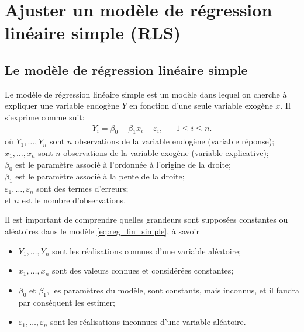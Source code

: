 \chapter{Ajuster un modèle de régression linéaire simple (RLS)}
\label{sec:AjusterRLS}

\section{Le modèle de régression linéaire simple}
\label{sec:ModèleRLS}

Le modèle de régression linéaire simple est un modèle dans lequel on cherche à expliquer une variable endogène $Y$ en fonction d'une seule variable exogène $x$. Il s'exprime comme suit:
\begin{eqnarray}
 Y_i = \beta_0 + \beta_1 x_i + \varepsilon_i, \ \ \ \ \ \ \ 1\leq i \leq n.
 \label{eq:reg_lin_simple}
\end{eqnarray}
où $Y_1,\ldots,Y_n$ sont $n$ observations de la variable endogène (variable réponse);\\
$x_1,\ldots,x_n$ sont $n$ observations de la variable exogène (variable explicative);\\
$\beta_0$ est le paramètre associé à l'ordonnée à l'origine de la droite;\\
$\beta_1$ est le paramètre associé à la pente de la droite;\\
$\varepsilon_1,\ldots,\varepsilon_n$ sont des termes d'erreurs;\\
et $n$ est le nombre d'observations.\\

\begin{remarque}
Il est important de comprendre quelles grandeurs sont supposées constantes ou aléatoires dans le modèle \eqref{eq:reg_lin_simple}, à savoir
 \begin{itemize}
 \item[$\bullet$]
 $Y_1,\ldots, Y_n$ sont les réalisations connues d'une variable aléatoire;
 \item[$\bullet$]
 $x_1,\ldots,x_n$ sont des valeurs connues et considérées constantes;
 \item[$\bullet$]
 $\beta_0$ et $\beta_1$, les paramètres du modèle, sont constants, mais inconnus, et il faudra par conséquent les estimer;
 \item[$\bullet$] $\varepsilon_1,\ldots,\varepsilon_n$ sont les réalisations inconnues d'une variable aléatoire.
  \end{itemize}
\end{remarque}

